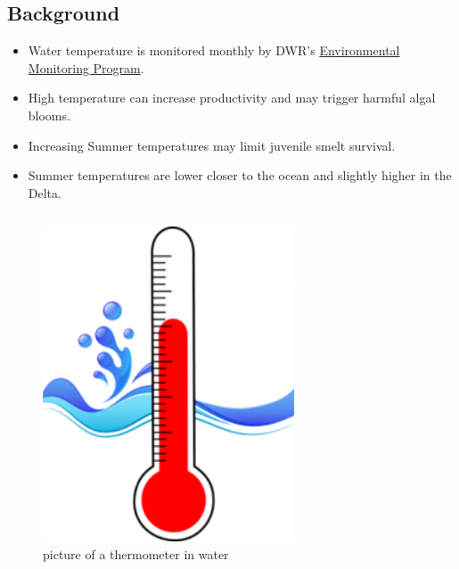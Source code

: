 \documentclass[
]{book}
\providecommand{\tightlist}{%
  \setlength{\itemsep}{0pt}\setlength{\parskip}{0pt}}
\begin{document}
\begin{columns-nocenter}

\begin{column}

\hypertarget{background-1}{%
\subsection{Background}\label{background-1}}

\begin{itemize}
\tightlist
\item
  Water temperature is monitored monthly by DWR's \href{https://emp.baydeltalive.com/wiki/12297}{Environmental Monitoring Program}.
\item
  High temperature can increase productivity and may trigger harmful algal blooms.
\item
  Increasing Summer temperatures may limit juvenile smelt survival.
\item
  Summer temperatures are lower closer to the ocean and slightly higher in the Delta.
\end{itemize}

\end{column}

\begin{column}

\begin{figure}

{\centering \includegraphics[width=2.94in]{figures/thermometer} 

}

\caption{picture of a thermometer in water}\label{fig:unnamed-chunk-55}
\end{figure}

\end{column}

\end{columns-nocenter}
\end{document}
